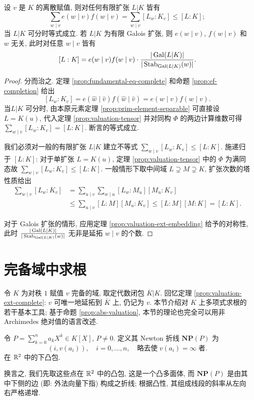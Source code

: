 \begin{corollary}[赋值论基本等式]\label{prop:fundamental-eq}
	设 $v$ 是 $K$ 的离散赋值, 则对任何有限扩张 $L|K$ 皆有
	\[ \sum_{w \mid v} e(w \mid v) f(w \mid v) = \sum_{w \mid v} [L_w : K_v] \leq [L:K]; \]
	当 $L|K$ 可分时等式成立. 若 $L|K$ 为有限 Galois 扩张, 则 $e(w \mid v)$, $f(w \mid v)$ 和 $w$ 无关, 此时对任意 $w \mid v$ 皆有
	\[ [L:K] = e(w \mid v) f(w \mid v) \cdot \frac{|\operatorname{Gal}(L|K)|}{|\operatorname{Stab}_{\operatorname{Gal}(L|K)}(w)|}. \]
\end{corollary}
\begin{proof}
	分而治之. 定理 \ref{prop:fundamental-eq-complete} 和命题 \ref{prop:ef-completion} 给出
	\[ [L_w:K_v] = e(\hat{w} \mid \hat{v}) f(\hat{w} \mid \hat{v}) = e(w \mid v) f(w \mid v). \]
	当$L|K$ 可分时, 由本原元素定理 \ref{prop:prim-element-separable} 可直接设 $L=K(u)$, 代入定理 \ref{prop:valuation-tensor} 并对同构 $\Phi$ 的两边计算维数可得 $\sum_{w \mid v} [L_w : K_v] = [L:K]$. 断言的等式成立.
	
	我们必须对一般的有限扩张 $L|K$ 建立不等式 $\sum_{w \mid v} [L_w : K_v] \leq [L:K]$. 施递归于 $[L:K]$: 对于单扩张 $L=K(u)$, 定理 \ref{prop:valuation-tensor} 中的 $\Phi$ 为满同态故 $\sum_{w \mid v} [L_w : K_v] \leq [L:K]$. 一般情形下取中间域 $L \supsetneq M \supsetneq K$, 扩张次数的塔性质给出
	\begin{align*}
		\sum_{w \mid v} [L_w : K_v] & = \sum_{u \mid v} \sum_{w \mid u} [L_w : M_u] [M_u : K_v] \\
		& \leq \sum_{u \mid v} [L:M] [M_u:K_v] \leq [L:M][M:K] = [L:K].
	\end{align*}

	对于 Galois 扩张的情形, 应用定理 \ref{prop:valuation-ext-embedding} 给予的对称性, 此时 $\frac{|\operatorname{Gal}(L|K)|}{|\operatorname{Stab}_{\operatorname{Gal}(L|K)}(w)|}$ 无非是延拓 $w \mid v$ 的个数.
\end{proof}

\section{完备域中求根}
令 $K$ 为对秩 $1$ 赋值 $v$ 完备的域, 取定代数闭包 $\overline{K}|K$. 回忆定理 \ref{prop:valuation-ext-complete}: $v$ 可唯一地延拓到 $\overline{K}$ 上, 仍记为 $v$. 本节介绍对 $K$ 上多项式求根的若干基本工具; 基于命题 \ref{prop:abs-valuation}, 本节的理论也完全可以用非 Archimedes 绝对值的语言改述.

\begin{definition}[Newton 折线]
	令 $P = \sum_{k=0}^n a_k X^k \in K[X]$, $P \neq 0$. 定义其 Newton 折线 $\textbf{NP}(P)$ 为
	\[ (i, v(a_i)), \quad i=0, \ldots, n, \quad \text{略去使}\; v(a_i)=\infty\; \text{者}. \]
	在 $\mathbb{R}^2$ 中的下凸包.
\end{definition}
换言之, 我们先取这些点在 $\mathbb{R}^2$ 中的凸包, 这是一个凸多面体, 而 $\textbf{NP}(P)$ 是由其中下侧的边 (即: 外法向量下指) 构成之折线; 根据凸性, 其组成线段的斜率从左向右严格递增.

